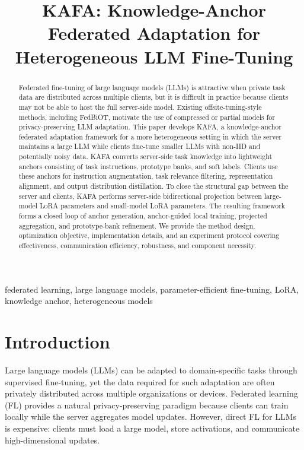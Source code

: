 \documentclass[conference]{IEEEtran}
\begin{document}
\title{KAFA: Knowledge-Anchor Federated Adaptation for Heterogeneous LLM Fine-Tuning}

\author{
}

\maketitle

\begin{abstract}
Federated fine-tuning of large language models (LLMs) is attractive when private task data are distributed across multiple clients, but it is difficult in practice because clients may not be able to host the full server-side model. Existing offsite-tuning-style methods, including FedBiOT, motivate the use of compressed or partial models for privacy-preserving LLM adaptation. This paper develops KAFA, a knowledge-anchor federated adaptation framework for a more heterogeneous setting in which the server maintains a large LLM while clients fine-tune smaller LLMs with non-IID and potentially noisy data. KAFA converts server-side task knowledge into lightweight anchors consisting of task instructions, prototype banks, and soft labels. Clients use these anchors for instruction augmentation, task relevance filtering, representation alignment, and output distribution distillation. To close the structural gap between the server and clients, KAFA performs server-side bidirectional projection between large-model LoRA parameters and small-model LoRA parameters. The resulting framework forms a closed loop of anchor generation, anchor-guided local training, projected aggregation, and prototype-bank refinement. We provide the method design, optimization objective, implementation details, and an experiment protocol covering effectiveness, communication efficiency, robustness, and component necessity.
\end{abstract}

\begin{IEEEkeywords}
federated learning, large language models, parameter-efficient fine-tuning, LoRA, knowledge anchor, heterogeneous models
\end{IEEEkeywords}

\section{Introduction}
Large language models (LLMs) can be adapted to domain-specific tasks through supervised fine-tuning, yet the data required for such adaptation are often privately distributed across multiple organizations or devices. Federated learning (FL) provides a natural privacy-preserving paradigm because clients can train locally while the server aggregates model updates. However, direct FL for LLMs is expensive: clients must load a large model, store activations, and communicate high-dimensional updates.
\end{document}
